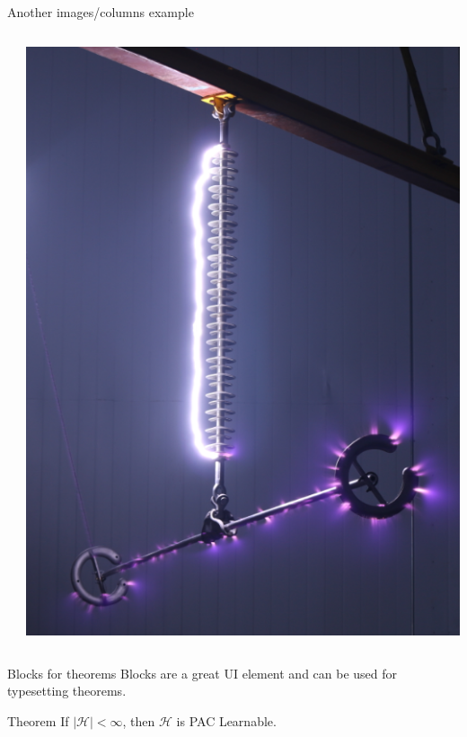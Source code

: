 \documentclass{beamer}
\begin{document}
\begin{frame}{Another images/columns example}
\begin{columns}
\begin{column}{0.3\textwidth}
\end{column}
\begin{column}{0.35\textwidth}
\includegraphics[height=0.8\textheight]{images/back_flashover.png}
\end{column}
\end{columns}
\end{frame}


\begin{frame}[fragile]{Blocks for theorems}
Blocks are a great UI element and can be used for typesetting theorems.
\begin{block}{Theorem}
If $\mid \mathcal{H} \mid < \infty$, then $\mathcal{H}$ is PAC Learnable.
\end{block}
\end{frame}
\end{document}

